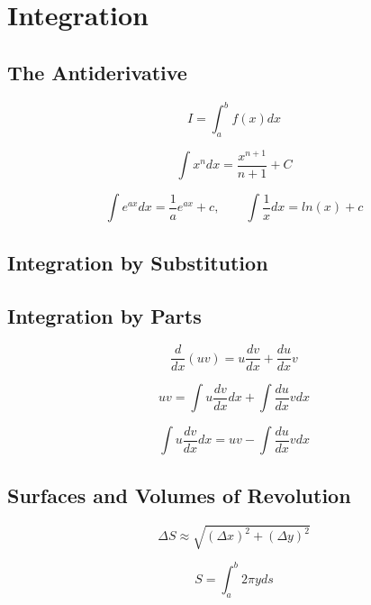 \documentclass[]{report}
\begin{document}
\section{Integration}
\subsection{The Antiderivative}

\begin{equation*}
    I = \int_{a}^{b} f(x)dx
\end{equation*}

\begin{equation*}
    \int x^{n}dx = \frac{x^{n+1}}{n+1} + C
\end{equation*}

\[\int e^{ax}dx = \frac{1}{a}e^{ax} + c, \qquad \int \frac{1}{x}dx = ln(x) + c\]

\subsection{Integration by Substitution}
\subsection{Integration by Parts}

\begin{equation*}
    \frac{d}{dx}(uv) = u \frac{dv}{dx} + \frac{du}{dx} v
\end{equation*}

\begin{equation*}
    uv = \int u \frac{dv}{dx} dx + \int \frac{du}{dx}vdx
\end{equation*}
    
\begin{equation*}
    \int u \frac{dv}{dx} dx = uv - \int \frac{du}{dx}vdx
\end{equation*}

\subsection{Surfaces and Volumes of Revolution}

\begin{equation*}
    \Delta S \approx \sqrt{(\Delta x)^{2} + (\Delta y)^{2}}
\end{equation*}

\begin{equation*}
    S = \int_{a}^{b} 2 \pi y ds
\end{equation*}
\end{document}
